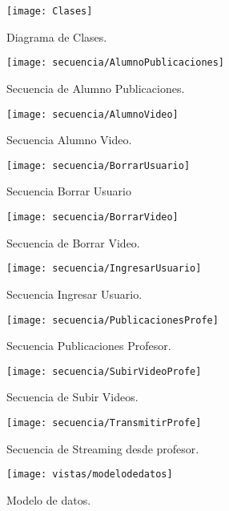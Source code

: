 \documentclass[12pt]{article}
\begin{document}
\begin{figure}
  \centering
      \texttt{[image: Clases]}
	    \caption{Diagrama de Clases.}
	\label{fig:Clases}
\end{figure}

\begin{figure}
  \centering
      \texttt{[image: secuencia/AlumnoPublicaciones]}
	    \caption{Secuencia de Alumno Publicaciones.}
	\label{fig:al_publ}
\end{figure}

\begin{figure}
  \centering
      \texttt{[image: secuencia/AlumnoVideo]}
	    \caption{Secuencia Alumno Video.}
	\label{fig:al_vid}
\end{figure}

\begin{figure}
  \centering
      \texttt{[image: secuencia/BorrarUsuario]}
	    \caption{Secuencia Borrar Usuario}
	\label{fig:sec_del_user}
\end{figure}

\begin{figure}
  \centering
      \texttt{[image: secuencia/BorrarVideo]}
	    \caption{Secuencia de Borrar Video.}
	\label{fig:del_vid}
\end{figure}

\begin{figure}
  \centering
      \texttt{[image: secuencia/IngresarUsuario]}
	    \caption{Secuencia Ingresar Usuario.}
	\label{fig:ing_user}
\end{figure}
\clearpage
\begin{figure}
  \centering
      \texttt{[image: secuencia/PublicacionesProfe]}
	    \caption{Secuencia Publicaciones Profesor.}
	\label{fig:sec_pub_prof}
\end{figure}

\begin{figure}
  \centering
      \texttt{[image: secuencia/SubirVideoProfe]}
	    \caption{Secuencia de Subir Videos.}
	\label{fig:sub_vid}
\end{figure}

\begin{figure}
	\centering
      \texttt{[image: secuencia/TransmitirProfe]}
	    \caption{Secuencia de Streaming desde profesor.}
	\label{fig:str_pr}
\end{figure}

\begin{figure}
  \centering
      \texttt{[image: vistas/modelodedatos]}
	    \caption{Modelo de datos.}
	\label{fig:moddatos}
\end{figure}
\end{document}
